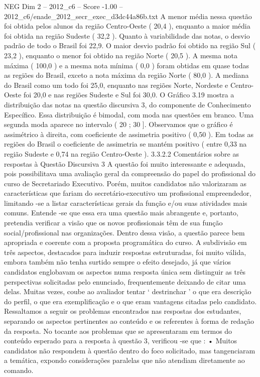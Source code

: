 \begin{textsample}{NEG Dim 2 – 2012\_c6 – Score -1.00 – 2012\_c6/enade\_2012\_secr\_exec\_d3dc44a86b.txt}
A menor média nessa questão foi obtida pelos alunos da região Centro-Oeste ( 20,4 ), enquanto a maior média foi obtida na região Sudeste ( 32,2 ).
Quanto à variabilidade das notas, o desvio padrão de todo o Brasil foi 22,9.
O maior desvio padrão foi obtido na região Sul ( 23,2 ), enquanto o menor foi obtido na região Norte ( 20,5 ).
A mesma nota máxima ( 100,0 ) e a mesma nota mínima ( 0,0 ) foram obtidas em quase todas as regiões do Brasil, exceto a nota máxima da região Norte ( 80,0 ).
A mediana do Brasil como um todo foi 25,0, enquanto nas regiões Norte, Nordeste e Centro-Oeste foi 20,0 e nas regiões Sudeste e Sul foi 30,0.
O Gráfico 3.19 mostra a distribuição das notas na questão discursiva 3, do componente de Conhecimento Específico.
Essa distribuição é bimodal, com moda nas questões em branco.
Uma segunda moda aparece no intervalo ( 20 ; 30 ].
Observamos que o gráfico é assimétrico à direita, com coeficiente de assimetria positivo ( 0,50 ).
Em todas as regiões do Brasil o coeficiente de assimetria se mantém positivo ( entre 0,33 na região Sudeste e 0,74 na região Centro-Oeste ). 3.3.2.2 Comentários sobre as respostas à Questão Discursiva 3 A questão foi muito interessante e adequada, pois possibilitava uma avaliação geral da compreensão do papel do profissional do curso de Secretariado Executivo.
Porém, muitos candidatos não valorizaram as características que fariam do secretário-executivo um profissional empreendedor, limitando -se a listar características gerais da função e/ou suas atividades mais comuns.
Entende -se que essa era uma questão mais abrangente e, portanto, pretendia verificar a visão que os novos profissionais têm de sua função social/profissional nas organizações.
Dentro dessa visão, a questão parece bem apropriada e coerente com a proposta programática do curso.
A subdivisão em três aspectos, destacados para induzir respostas estruturadas, foi muito válida, embora também não tenha surtido sempre o efeito desejado, já que vários candidatos englobavam os aspectos numa resposta única sem distinguir as três perspectivas solicitadas pelo enunciado, frequentemente deixando de citar uma delas.
Muitas vezes, coube ao avaliador tentar ‘ destrinchar ’ o que era descrição do perfil, o que era exemplificação e o que eram vantagens citadas pelo candidato.
Ressaltamos a seguir os problemas encontrados nas respostas dos estudantes, separando os aspectos pertinentes ao conteúdo e os referentes à forma de redação da resposta.
No tocante aos problemas que se apresentaram em termos do conteúdo esperado para a resposta à questão 3, verificou -se que : • Muitos candidatos não respondem à questão dentro do foco solicitado, mas tangenciaram a temática, expondo considerações paralelas que não atendiam diretamente ao comando.

\end{textsample}
